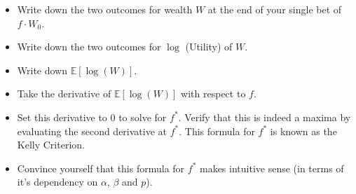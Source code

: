 \documentclass[12pt]{exam}
\begin{document}
\begin{questions}
\begin{itemize}
\item Write down the two outcomes for wealth $W$ at the end of your single bet of $f \cdot W_0$.
\item Write down the two outcomes for $\log$ (Utility) of $W$.
\item Write down $\mathbb{E}[\log(W)]$.
\item Take the derivative of $\mathbb{E}[\log(W)]$ with respect to $f$. 
\item Set this derivative to 0 to solve for $f^*$. Verify that this is indeed a maxima by evaluating the second derivative at $f^*$. This formula for $f^*$ is known as the Kelly Criterion. 
\item Convince yourself that this formula for $f^*$ makes intuitive sense (in terms of it's dependency on $\alpha$, $\beta$ and $p$).
\end{itemize}

\end{questions}
\end{document}
